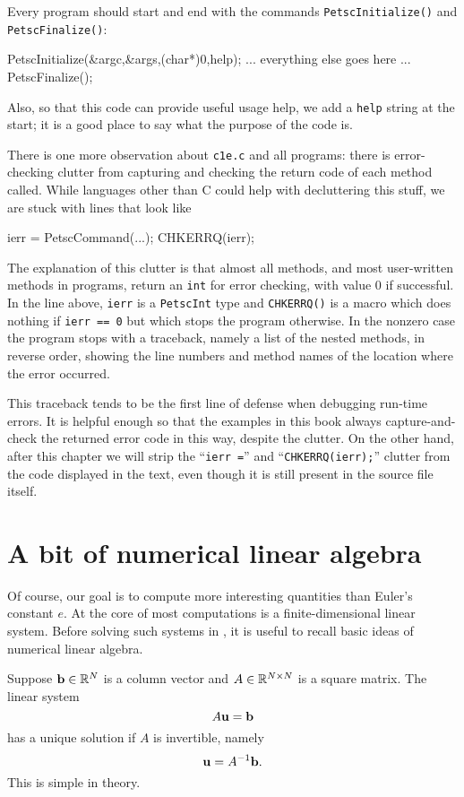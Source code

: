Every \PETSc program should start and end with the commands \texttt{PetscInitialize()} and \texttt{PetscFinalize()}:
\begin{code}
PetscInitialize(&argc,&args,(char*)0,help);
... everything else goes here ...
PetscFinalize();
\end{code}
Also, so that this \PETSc code can provide useful usage help, we add a \texttt{help} string at the start; it is a good place to say what the purpose of the code is.

There is one more observation about \texttt{c1e.c} and all \PETSc programs: there is error-checking clutter from capturing and checking the return code of each method called.  While languages other than C could help with decluttering this stuff, we are stuck with lines that look like
\begin{code}
ierr = PetscCommand(...); CHKERRQ(ierr);
\end{code}
The explanation of this clutter is that almost all \PETSc methods, and most user-written methods in \PETSc programs, return an \texttt{int} for error checking, with value $0$ if successful.  In the line above, \texttt{ierr} is a \texttt{PetscInt} type and \texttt{CHKERRQ()} is a macro which does nothing if \texttt{ierr == 0} but which stops the program otherwise.  In the nonzero case the program stops with a traceback, namely a list of the nested methods, in reverse order, showing the line numbers and method names of the location where the error occurred.

This traceback tends to be the first line of defense when debugging run-time errors.  It is helpful enough so that the examples in this book always capture-and-check the returned error code in this way, despite the clutter.  On the other hand, after this chapter we will strip the ``\texttt{ierr =}'' and ``\texttt{CHKERRQ(ierr);}'' clutter from the code displayed in the text, even though it is still present in the source file itself.


\section{A bit of numerical linear algebra}

Of course, our goal is to compute more interesting quantities than Euler's constant $e$.  At the core of most \PETSc computations is a finite-dimensional linear system.  Before solving such systems in \PETSc, it is useful to recall basic ideas of numerical linear algebra.

Suppose $\mathbf{b}\in \mathbb{R}^{N}$ is a column vector and $A\in\mathbb{R}^{N\times N}$ is a square matrix.  The linear system
\begin{equation}
A \mathbf{u} = \mathbf{b} \label{introsystem}
\end{equation}
has a unique solution if $A$ is invertible, namely
\begin{equation}
\mathbf{u} = A^{-1} \mathbf{b}. \label{introsolution}
\end{equation}
This is simple in theory.

